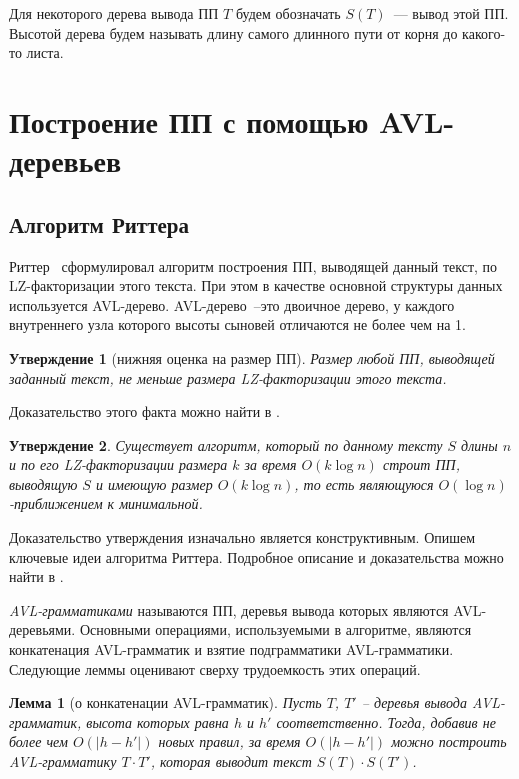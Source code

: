 \documentclass[14pt]{article}
\newtheorem{lemma}{Лемма}[section]
\newtheorem{claim}{Утверждение}[section]
\begin{document}
Для некоторого дерева вывода ПП $T$ будем обозначать $S(T)$~--- вывод этой ПП.
Высотой дерева будем называть длину самого длинного пути от корня до какого-то листа.

\section{Построение ПП с помощью AVL-деревьев}

\subsection{Алгоритм Риттера}

Риттер~\cite{RytterSLPConstruction} сформулировал алгоритм построения ПП, выводящей данный текст, по LZ-факторизации этого текста.
При этом в качестве основной структуры данных используется AVL-дерево. AVL-дерево~--это двоичное дерево, у каждого внутреннего узла которого
высоты сыновей отличаются не более чем на 1.

\begin{claim}[нижняя оценка на размер ПП]
	Размер любой ПП, выводящей заданный текст, не меньше размера LZ-факторизации этого текста.
\end{claim}

Доказательство этого факта можно найти в \cite{RytterSLPConstruction}.

\begin{claim}
Существует алгоритм, который по данному тексту $S$ длины $n$ и по его LZ-факторизации размера $k$ за время $O(k\log n)$
строит ПП, выводящую $S$ и имеющую размер $O(k\log n)$, то есть являющуюся $O(\log n)$-приближением к минимальной.
\end{claim}

Доказательство утверждения изначально является конструктивным. Опишем ключевые идеи алгоритма Риттера.
Подробное описание и доказательства можно найти в \cite{RytterSLPConstruction}.

\emph{AVL-грамматиками} называются ПП, деревья вывода которых являются AVL-деревьями. Основными операциями, используемыми
в алгоритме, являются конкатенация AVL-грам\-ма\-тик и взятие подграмматики AVL-грам\-ма\-тики. Следующие леммы
оценивают сверху трудоемкость этих операций.

\begin{lemma}[о конкатенации AVL-грам\-ма\-тик]
\label{avl-concat-lemma}
Пусть $T$, $T'$ -- деревья вывода AVL-грамматик, высота которых равна $h$ и $h'$ соответственно. Тогда, добавив не более
чем $O\left(|h - h'|\right)$ новых правил, за время $O\left(|h - h'|\right)$ можно построить AVL-грамматику $T \cdot T'$, которая выводит текст
$S(T)\cdot S(T')$.
\end{lemma}
\end{document}
